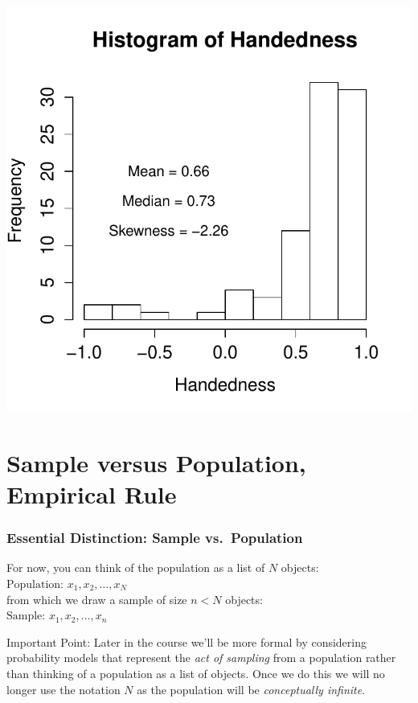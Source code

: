 

\begin{frame}
\centering \includegraphics[scale = 0.75]{./images/handedness_skew}


\end{frame}
\section{Sample versus Population, Empirical Rule}
\begin{frame}
\frametitle{Essential Distinction: Sample vs.\ Population}
For now, you can think of the population as a list of $N$ objects:\\
	\alert{$\mbox{Population: }x_1, x_2, \hdots, x_N$}\\
from which we draw a sample of size $n<N$ objects:\\
	\alert{$\mbox{Sample: } x_1, x_2, \hdots, x_n$}
\pause
\vspace{3em}
\begin{alertblock}{Important Point:}
Later in the course we'll be more formal by considering \alert{probability models} that represent the \alert{\emph{act of sampling}} from a population rather than thinking of a population as a list of objects. Once we do this we will no longer use the notation $N$ as the population will be \alert{\emph{conceptually infinite}}.
\end{alertblock}
\end{frame}

